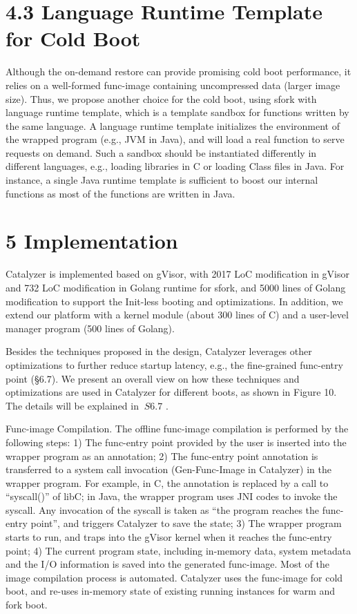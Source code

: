 \documentclass[
  10
]{article}
\begin{document}
\section{4.3 Language Runtime Template for Cold
Boot}\label{language-runtime-template-for-cold-boot}

Although the on-demand restore can provide promising cold boot
performance, it relies on a well-formed func-image containing
uncompressed data (larger image size). Thus, we propose another choice
for the cold boot, using sfork with language runtime template, which is
a template sandbox for functions written by the same language. A
language runtime template initializes the environment of the wrapped
program (e.g., JVM in Java), and will load a real function to serve
requests on demand. Such a sandbox should be instantiated differently in
different languages, e.g., loading libraries in C or loading Class files
in Java. For instance, a single Java runtime template is sufficient to
boost our internal functions as most of the functions are written in
Java.

\section{5 Implementation}\label{implementation}

Catalyzer is implemented based on gVisor, with 2017 LoC modification in
gVisor and 732 LoC modification in Golang runtime for sfork, and 5000
lines of Golang modification to support the Init-less booting and
optimizations. In addition, we extend our platform with a kernel module
(about 300 lines of C) and a user-level manager program (500 lines of
Golang).

Besides the techniques proposed in the design, Catalyzer leverages other
optimizations to further reduce startup latency, e.g., the fine-grained
func-entry point (§6.7). We present an overall view on how these
techniques and optimizations are used in Catalyzer for different boots,
as shown in Figure 10. The details will be explained in \(\ S 6 . 7\) .

Func-image Compilation. The offline func-image compilation is performed
by the following steps: 1) The func-entry point provided by the user is
inserted into the wrapper program as an annotation; 2) The func-entry
point annotation is transferred to a system call invocation
(Gen-Func-Image in Catalyzer) in the wrapper program. For example, in C,
the annotation is replaced by a call to ``syscall()'' of libC; in Java,
the wrapper program uses JNI codes to invoke the syscall. Any invocation
of the syscall is taken as ``the program reaches the func-entry point'',
and triggers Catalyzer to save the state; 3) The wrapper program starts
to run, and traps into the gVisor kernel when it reaches the func-entry
point; 4) The current program state, including in-memory data, system
metadata and the I/O information is saved into the generated func-image.
Most of the image compilation process is automated. Catalyzer uses the
func-image for cold boot, and re-uses in-memory state of existing
running instances for warm and fork boot.
\end{document}
